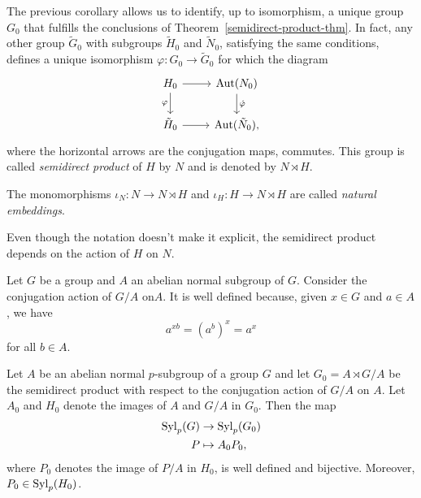 \begin{defn}
    The previous corollary allows us to identify, up to isomorphism, a unique group $G_0$ that fulfills the conclusions of\/ {\upshape Theorem~\ref{semidirect-product-thm}}. In fact, any other group $\tilde G_0$ with subgroups $\tilde H_0$ and $\tilde N_0$, satisfying the same conditions, defines a unique isomorphism $\varphi\colon G_0\to\tilde G_0$ for which the diagram
    $$
        \begin{tikzcd}
            H_0\arrow[r]\arrow[d,"\varphi"']
                &\Aut(N_0)\arrow[d,"\hat\varphi"]
                \\
            \tilde H_0\arrow[r]
                &\Aut(\tilde N_0),
        \end{tikzcd}
    $$
    where the horizontal arrows are the conjugation maps, commutes. This group is called \textsl{semidirect product} of\/ $H$ by\/ $N$ and is denoted by\/ $N\rtimes H$.

    The monomorphisms $\iota_N\colon N\to N\rtimes H$ and $\iota_H\colon H\to N\rtimes H$ are called \textsl{natural embeddings}.

    Even though the notation doesn't make it explicit, the semidirect product depends on the action of\/ $H$ on\/ $N$.
\end{defn}

\begin{rem}
Let\/ $G$ be a group and\/ $A$ an abelian normal subgroup of\/ $G$. Consider the conjugation action of\/ $G/A$ on\/$A$. It is well defined because, given\/ $x\in G$ and\/ $a\in A$, we have
$$
a^{xb}=(a^b)^x=a^x
$$
for all\/ $b\in A$.
\end{rem}

\begin{prop}\label{normal-abelian-to-semidirect}
    Let\/ $A$ be an abelian normal\/ $p$-subgroup of a group\/ $G$ and let\/ $G_0=A\rtimes G/A$ be the semidirect product with respect to the conjugation action of\/ $G/A$ on\/ $A$. Let\/ $A_0$ and\/ $H_0$ denote the images of\/ $A$ and\/ $G/A$ in\/ $G_0$. Then the map
    \begin{align*}
        {\rm Syl}_p(G)&\to {\rm Syl}_p(G_0)\\
        P&\mapsto A_0P_0,
    \end{align*}
    where\/ $P_0$ denotes the image of\/ $P/A$ in\/ $H_0$, is well defined and bijective. Moreover, $P_0\in{\rm Syl}_p(H_0)$.
\end{prop}

